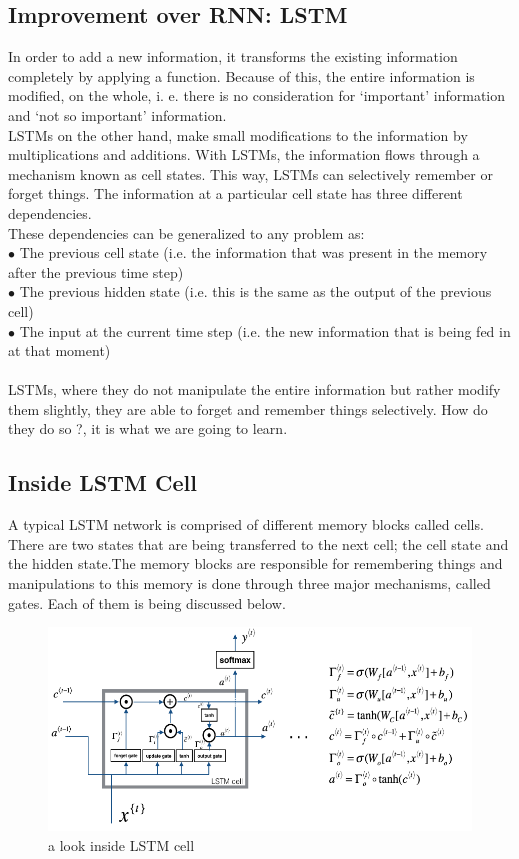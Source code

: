 \subsection{Improvement over RNN: LSTM}
In order to add a new information, it transforms the existing information completely by applying a function. Because of this, the entire information is modified, on the whole, i. e. there is no consideration for ‘important’ information and ‘not so important’ information.\\
LSTMs on the other hand, make small modifications to the information by multiplications and additions. With LSTMs, the information flows through a mechanism known as cell states. This way, LSTMs can selectively remember or forget things. The information at a particular cell state has three different dependencies.\\
These dependencies can be generalized to any problem as:\\
\indent$\bullet$ The previous cell state (i.e. the information that was present in the memory after the previous time step)\\
\indent$\bullet$ The previous hidden state (i.e. this is the same as the output of the previous cell)\\
\indent$\bullet$ The input at the current time step (i.e. the new information that is being fed in at that moment)\\\\
 LSTMs, where they do not manipulate the entire information but rather modify them slightly, they are able to forget and remember things selectively. How do they do so ?, it is what we are going to learn.
 \subsection{Inside LSTM Cell}
 A typical LSTM network is comprised of different memory blocks called cells.
   There are two states that are being transferred to the next cell; the cell state and the hidden state.The memory blocks are responsible for remembering things and manipulations to this memory is done through three major mechanisms, called gates. Each of them is being discussed below.
 \begin{figure}[H]%
    \center%
    \includegraphics[width=\textwidth]{images/amir/cap1.png}%
    \caption[This is lstm-inside image]{a look inside LSTM cell}\label{fig:lstm inside}%
  \end{figure}
